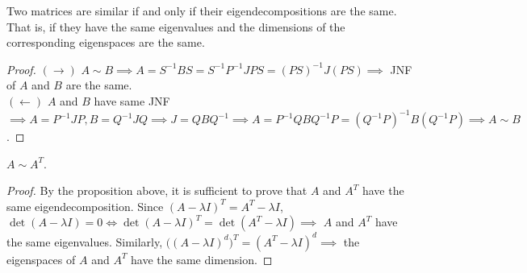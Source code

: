   \begin{proposition}
  Two matrices are similar if and only if their eigendecompositions are the same. That is, if they have the same eigenvalues and the dimensions of the corresponding eigenspaces are the same. 
  \end{proposition}

  \begin{proof}
  $(\rightarrow)$ $A \sim B \implies A = S^{-1} B S = S^{-1} P^{-1} J P S = (PS)^{-1} J (PS) \implies$ JNF of $A$ and $B$ are the same.  \\
  $(\leftarrow)$ $A$ and $B$ have same JNF $\implies A = P^{-1} J P, B = Q^{-1} J Q \implies J = Q B Q^{-1} \implies A = P^{-1} Q B Q^{-1} P = (Q^{-1} P)^{-1} B (Q^{-1} P) \implies A \sim B$. 
  \end{proof}

  \begin{theorem}
  $A \sim A^T$. 
  \end{theorem}
  \begin{proof}
  By the proposition above, it is sufficient to prove that $A$ and $A^T$ have the same eigendecomposition. Since $(A - \lambda I)^T = A^T - \lambda I$, $\det{(A - \lambda I)} = 0 \iff \det{(A - \lambda I)^T} = \det{(A^T - \lambda I)} \implies $ $A$ and $A^T$ have the same eigenvalues. Similarly, $\big( (A - \lambda I)^d \big)^T = (A^T - \lambda I)^d \implies$ the eigenspaces of $A$ and $A^T$ have the same dimension. 
  \end{proof}

